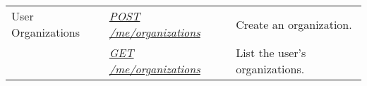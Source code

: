 \documentclass[letterpaper,10pt,english]{sphinxmanual}
\begin{document}
\noindent\begin{tabulary}{\linewidth}{|L|L|L|}
\hline
{}\relax &\relax &\relax \\
\hline
User Organizations
&
{\hyperref[\detokenize{resources/user:post--me-organizations}]{\emph{POST /me/organizations}}}
&
Create an organization.
\\
\hline&
{\hyperref[\detokenize{resources/user:get--me-organizations}]{\emph{GET /me/organizations}}}
&
List the user's organizations.
\\
\hline\end{tabulary}


\begin{DUlineblock}{0em}
\item[] 
\end{DUlineblock}
\end{document}
